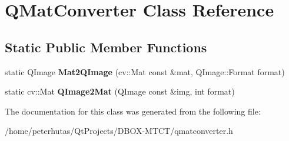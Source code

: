 \hypertarget{class_q_mat_converter}{}\section{Q\+Mat\+Converter Class Reference}
\label{class_q_mat_converter}
\subsection*{Static Public Member Functions}
\begin{DoxyCompactItemize}
\item 
\mbox{\label{class_q_mat_converter_a4232c4477672e4ab51ceb442bb460eb1}} 
static Q\+Image {\bfseries Mat2\+Q\+Image} (cv\+::\+Mat const \&mat, Q\+Image\+::\+Format format)
\item 
\mbox{\label{class_q_mat_converter_a5f502e766bfb68c82ec47be0aa2a7e3b}} 
static cv\+::\+Mat {\bfseries Q\+Image2\+Mat} (Q\+Image const \&img, int format)
\end{DoxyCompactItemize}


The documentation for this class was generated from the following file\+:\begin{DoxyCompactItemize}
\item 
/home/peterhutas/\+Qt\+Projects/\+D\+B\+O\+X-\/\+M\+T\+C\+T/qmatconverter.\+h\end{DoxyCompactItemize}

